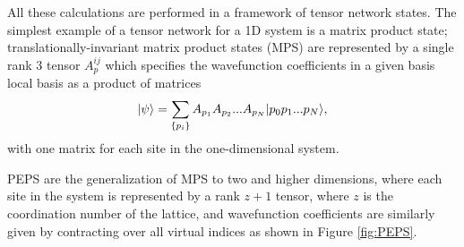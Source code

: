 All these calculations are performed in a framework of tensor network states.
The simplest example of a tensor network for a 1D system is a matrix
product state; translationally-invariant matrix product states (MPS)
are represented by a single rank 3 tensor $A_p^{ij}$ which specifies
the wavefunction coefficients in a given basis local basis as a
product of matrices $$\vert \psi \rangle = \sum\limits_{\{p_i\}} A_{p_1}
A_{p_2} ... A_{p_N} \vert p_0 p_1 ... p_N \rangle,$$ with one matrix for each
site in the one-dimensional system.

PEPS are the generalization of MPS to two and higher dimensions, where
each site in the system is represented by a rank $z+1$ tensor, where
$z$ is the coordination number of the lattice, and wavefunction
coefficients are similarly given by contracting over all virtual
indices as shown in Figure \ref{fig:PEPS}.\cite{verstraete2004} 